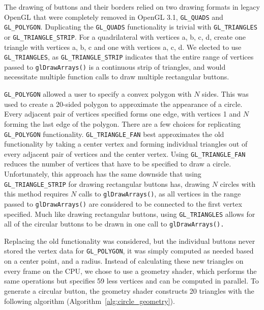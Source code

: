 The drawing of buttons and their borders relied on two drawing formats in legacy OpenGL that were 
completely removed in OpenGL 3.1, {\tt GL\_QUADS} and {\tt GL\_POLYGON\@}. Duplicating the {\tt GL\_QUADS} functionality 
is trivial with {\tt GL\_TRIANGLES} or {\tt GL\_TRIANGLE\_STRIP\@}. For a quadrilateral with vertices a, b, 
c, d, create one triangle with vertices a, b, c and one with vertices a, c, d. We elected to 
use {\tt GL\_TRIANGLES}, as {\tt GL\_TRIANGLE\_STRIP} indicates that the entire range of vertices passed to
{\tt glDrawArrays()} is a continuous strip of triangles, and would necessitate multiple function 
calls to draw multiple rectangular buttons.

{\tt GL\_POLYGON} allowed a user to specify a convex polygon with $N$ sides. This was used to create 
a 20-sided polygon to approximate the appearance of a circle. Every adjacent pair of vertices 
specified forms one edge, with vertices 1 and $N$ forming the last edge of the polygon. There are a few choices for replicating {\tt GL\_POLYGON} functionality. {\tt GL\_TRIANGLE\_FAN} best approximates 
the old functionality by taking a center vertex and forming individual triangles out of every 
adjacent pair of vertices and the center vertex. Using {\tt GL\_TRIANGLE\_FAN} reduces the number of vertices that have to be specified to draw a circle. Unfortunately, this approach has the same 
downside that using {\tt GL\_TRIANGLE\_STRIP} for drawing rectangular buttons has, drawing $N$ circles 
with this method requires $N$ calls to {\tt glDrawArrays()}, as all vertices in the range passed to {\tt glDrawArrays()} are considered to be connected to the first vertex specified. Much like drawing rectangular buttons, using {\tt GL\_TRIANGLES}
allows for all of the circular buttons to be drawn in one call to {\tt glDrawArrays().}

Replacing the old functionality was considered, but the individual buttons never stored the 
vertex data for {\tt GL\_POLYGON}, it was simply computed as needed based on a center point, and a 
radius. Instead of calculating these new triangles on every frame on the CPU, we chose to use a geometry 
shader, which performs the same operations but specifies 59 less vertices and can be computed in parallel. To generate a circular button, the geometry shader constructs 20 triangles with the 
following algorithm (Algorithm~\ref{alg:circle_geometry}). 

